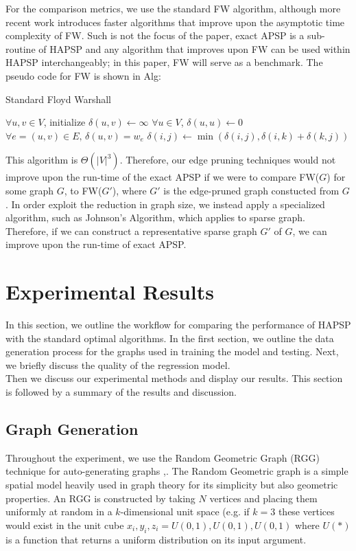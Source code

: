 \documentclass[10.5pt,journal]{IEEEtran}
\begin{document}
	For the comparison metrics, we use the standard FW algorithm, although more recent work
	introduces faster algorithms that improve upon the asymptotic time complexity of FW. Such
	is not the focus of the paper, exact APSP is a sub-routine of HAPSP and any algorithm that
	improves upon FW can be used within HAPSP interchangeably; 
	in this paper, FW will serve as a benchmark. The pseudo code for FW is shown in Alg:\\
	\begin{algorithm}
	\caption{Standard Floyd Warshall}
	\begin{algorithmic}[1]
	\State $\forall u,v \in V$, initialize $\delta(u,v)\leftarrow\infty$
	\State $\forall u \in V$, $\delta(u,u)\leftarrow 0$
	\State $\forall e = (u,v)\in E,\,\delta(u,v) = w_e$
				\State $\delta(i,j) \leftarrow \min(\delta(i,j),\delta(i,k)+\delta(k,j))$
			\EndFor
		\EndFor
	\EndFor
	\end{algorithmic}
	\label{fig:alg2}
	\end{algorithm}
	
	This algorithm is $\Theta(|V|^3)$. Therefore, our edge pruning techniques would not improve upon
	the run-time of the exact APSP if we were to compare FW($G$) for some graph $G$, to FW($G'$),
	where $G'$ is the edge-pruned graph constucted from $G$. In order exploit the reduction in graph
	size, we instead apply a specialized algorithm, such as Johnson's Algorithm, which applies to
	sparse graph. Therefore, if we can construct a representative sparse graph $G'$ of $G$,
	we can improve upon the run-time of exact APSP.\\
	
\section{Experimental Results}
	In this section, we outline the workflow for comparing the performance of HAPSP with the
	standard optimal algorithms. In the first section, we outline the data generation process
	for the graphs used in training the model and testing. Next, we briefly discuss the quality
	of the regression model. \\
	
	Then we discuss our experimental methods and display our results. This section is followed by
	a summary of the results and discussion.
	\subsection{Graph Generation}
		Throughout the experiment, we use the Random Geometric Graph (RGG) technique for auto-generating graphs
		\cite{randGeom},\cite{randGeom2}.
		The Random Geometric graph is a simple spatial model heavily used in graph theory for its simplicity
		but also geometric properties. An RGG is constructed by taking $N$ vertices and placing them
		uniformly at random in a $k$-dimensional unit space (e.g. if $k=3$ these vertices would exist in
		the unit cube $x_i,y_i,z_i = U(0,1),U(0,1),U(0,1)$ where $U(*)$ is a function that returns a uniform
		distribution on its input argument.\\
		
\end{document}
